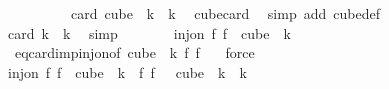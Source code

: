 \begin{isabellebody}
\ \isanewline
\ \ \isacommand{{\isacharbraceleft}{\kern0pt}}\isamarkupfalse%
\isanewline
\ \ \ \ \isamarkupfalse%
\ {\isachardoublequoteopen}card\ {\isacharparenleft}{\kern0pt}cube\ {}\ k{\isacharparenright}{\kern0pt}\ {\isacharequal}{\kern0pt}\ k{\isachardoublequoteclose}\ \isamarkupfalse%
\ cube{\isacharunderscore}{\kern0pt}card\ \isamarkupfalse%
\ {\isacharparenleft}{\kern0pt}simp\ add{\isacharcolon}{\kern0pt}\ cube{\isacharunderscore}{\kern0pt}def{\isacharparenright}{\kern0pt}\isanewline
\ \ \ \ \isamarkupfalse%
\ \isamarkupfalse%
\ {\isachardoublequoteopen}card\ {\isacharbraceleft}{\kern0pt}{\isachardot}{\kern0pt}{\isachardot}{\kern0pt}{\isacharless}{\kern0pt}k{\isacharbraceright}{\kern0pt}\ {\isacharequal}{\kern0pt}\ k{\isachardoublequoteclose}\ \isamarkupfalse%
\ simp\isanewline
\ \ \ \ \isamarkupfalse%
\ \isamarkupfalse%
\ {\isachardoublequoteopen}inj{\isacharunderscore}{\kern0pt}on\ {\isacharparenleft}{\kern0pt}{\isasymlambda}f{\isachardot}{\kern0pt}\ f\ {}{\isacharparenright}{\kern0pt}\ {\isacharparenleft}{\kern0pt}cube\ {}\ k{\isacharparenright}{\kern0pt}{\isachardoublequoteclose}\ \isamarkupfalse%
\ {\isacharasterisk}{\kern0pt}\ eq{\isacharunderscore}{\kern0pt}card{\isacharunderscore}{\kern0pt}imp{\isacharunderscore}{\kern0pt}inj{\isacharunderscore}{\kern0pt}on{\isacharbrackleft}{\kern0pt}of\ {\isachardoublequoteopen}cube\ {}\ k{\isachardoublequoteclose}\ {\isachardoublequoteopen}{\isasymlambda}f{\isachardot}{\kern0pt}\ f\ {}{\isachardoublequoteclose}{\isacharbrackright}{\kern0pt}\ \isamarkupfalse%
\ force\isanewline
\ \ \isacommand{{\isacharbraceright}{\kern0pt}}\isamarkupfalse%
\isanewline
\ \ \isamarkupfalse%
\ \isamarkupfalse%
\ {\isachardoublequoteopen}inj{\isacharunderscore}{\kern0pt}on\ {\isacharparenleft}{\kern0pt}{\isasymlambda}f{\isachardot}{\kern0pt}\ f\ {}{\isacharparenright}{\kern0pt}\ {\isacharparenleft}{\kern0pt}cube\ {}\ k{\isacharparenright}{\kern0pt}\ {\isasymand}\ {\isacharparenleft}{\kern0pt}{\isasymlambda}f{\isachardot}{\kern0pt}\ f\ {}{\isacharparenright}{\kern0pt}\ {\isacharbackquote}{\kern0pt}\ cube\ {}\ k\ {\isacharequal}{\kern0pt}\ {\isacharbraceleft}{\kern0pt}{\isachardot}{\kern0pt}{\isachardot}{\kern0pt}{\isacharless}{\kern0pt}k{\isacharbraceright}{\kern0pt}{\isachardoublequoteclose}\ \isamarkupfalse%

\end{isabellebody}
